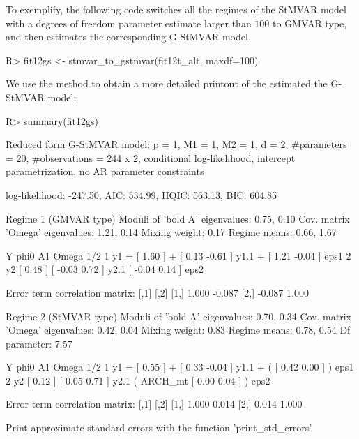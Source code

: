 \documentclass[nojss]{jss}
\begin{document}
To exemplify, the following code switches all the regimes of the StMVAR model  with a degrees of freedom parameter estimate larger than $100$ to GMVAR type, and then estimates the corresponding G-StMVAR model.
%
\begin{CodeChunk}
\begin{CodeInput}
R> fit12gs <- stmvar_to_gstmvar(fit12t_alt, maxdf=100)
\end{CodeInput}
\end{CodeChunk}
%
We use the  method to obtain a more detailed printout of the estimated the G-StMVAR model:
%
\begin{CodeChunk}
\begin{CodeInput}
R> summary(fit12gs)
\end{CodeInput}
\begin{CodeOutput}
Reduced form G-StMVAR model:
 p = 1, M1 = 1, M2 = 1, d = 2, #parameters = 20, #observations = 244 x 2,
 conditional log-likelihood, intercept parametrization, no AR parameter
 constraints

 log-likelihood: -247.50, AIC: 534.99, HQIC: 563.13, BIC: 604.85

Regime 1 (GMVAR type)
Moduli of 'bold A' eigenvalues:  0.75, 0.10
Cov. matrix 'Omega' eigenvalues: 1.21, 0.14
Mixing weight: 0.17
Regime means: 0.66, 1.67

   Y     phi0          A1                  Omega         1/2
1 y1 = [ 1.60 ] + [  0.13 -0.61 ] y1.1 + [  1.21 -0.04 ]     eps1
2 y2   [ 0.48 ]   [ -0.03  0.72 ] y2.1   [ -0.04  0.14 ]     eps2

Error term correlation matrix:
       [,1]   [,2]
[1,]  1.000 -0.087
[2,] -0.087  1.000

Regime 2 (StMVAR type)
Moduli of 'bold A' eigenvalues:  0.70, 0.34
Cov. matrix 'Omega' eigenvalues: 0.42, 0.04
Mixing weight: 0.83
Regime means: 0.78, 0.54
Df parameter:  7.57

   Y     phi0          A1                            Omega          1/2
1 y1 = [ 0.55 ] + [  0.33 -0.04 ] y1.1 + (         [  0.42 0.00 ] )     eps1
2 y2   [ 0.12 ]   [  0.05  0.71 ] y2.1   ( ARCH_mt [  0.00 0.04 ] )     eps2

Error term correlation matrix:
      [,1]  [,2]
[1,] 1.000 0.014
[2,] 0.014 1.000

Print approximate standard errors with the function 'print_std_errors'.
\end{CodeOutput}
\end{CodeChunk}
%
\end{document}
